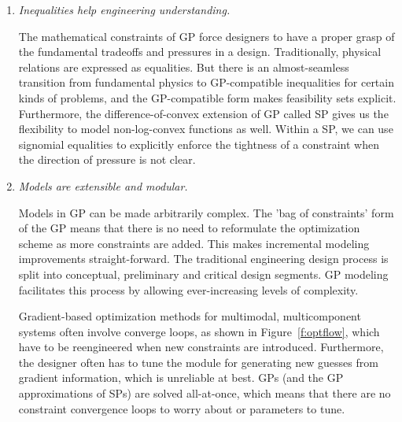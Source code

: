\begin{enumerate}

    \item \textit{Inequalities help engineering understanding.}

The mathematical constraints of \gls{GP} force designers to have a proper grasp
of the fundamental tradeoffs and pressures in a design.
    Traditionally, physical relations are expressed as equalities. But there is an
almost-seamless transition from fundamental physics to GP-compatible
inequalities for certain kinds of problems, and the \gls{GP}-compatible
    form makes feasibility sets explicit. Furthermore, the difference-of-convex
    extension of \gls{GP} called \gls{SP} gives us the flexibility to model
    non-log-convex functions as well. Within a \gls{SP},
    we can use signomial equalities to explicitly enforce the tightness of a
    constraint when the direction of pressure is not clear.

    \item \textit{Models are extensible and modular.}
    
Models in \gls{GP} can be made arbitrarily complex. The 'bag of constraints' form of the \gls{GP}
means that there is no need to reformulate the optimization scheme as more
constraints are added. This makes incremental modeling improvements straight-forward.
The traditional engineering design process is split into conceptual, preliminary
and critical design segments. GP modeling facilitates this process by allowing
ever-increasing levels of complexity.

Gradient-based optimization methods for
multimodal, multicomponent systems often involve
converge loops, as shown in Figure~\ref{f:optflow}, which have to be reengineered
    when new constraints are introduced. Furthermore, the designer often has to tune
    the module for generating new guesses from gradient information, which is unreliable
    at best. \gls{GP}s (and the \gls{GP} approximations
    of \gls{SP}s) are solved all-at-once, which means that there are no constraint
    convergence loops to worry about or parameters to tune.

\begin{figure*}[!b]
\begin{subfigure}[b]{0.5\linewidth}
    \begin{center}
\end{center}
\end{subfigure}
\end{figure*}
\end{enumerate}
